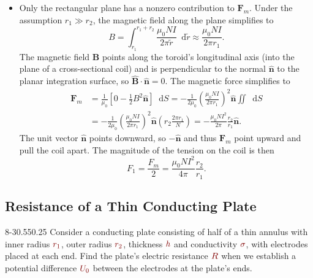 \documentclass[11pt, a4paper]{article}
\newcommand{\diff}{\mathop{}\!\mathrm{d}} %
\newcommand{\dmath}[1]{\textcolor{Maroon}{#1}}  %
\renewcommand{\vec}[1]{\bm{#1}} %
\newcommand{\uvec}[1]{\hat{\vec{#1}}} %
\newcommand{\defaultQuestionWidth}{0.55}
\begin{document}
\begin{itemize}
	\item Only the rectangular plane has a nonzero contribution to $ \vec{F}_{m} $. Under the assumption $ r_{1} \gg r_{2} $, the magnetic field along the plane simplifies to
	\begin{equation*}
		B = \int_{r_{1}}^{r_{1} + r_{2}} \frac{\mu_{0}NI}{2\pi \tilde{r}} \diff \tilde{r} \approx \frac{\mu_{0}NI}{2\pi r_{1}}.
	\end{equation*}
	The magnetic field $ \vec{B} $ points along the toroid's longitudinal axis (into the plane of a cross-sectional coil) and is perpendicular to the normal $ \uvec{n} $ to the planar integration surface, so $ \uvec{B} \cdot \uvec{n} = 0 $. The magnetic force simplifies to
	\begin{align*}
		\vec{F}_{m} &= \frac{1}{\mu_{0}}\left [0 - \frac{1}{2}B^{2}\uvec{n}\right ] \diff S = - \frac{1}{2\mu_{0}} \left(\frac{\mu_{0}NI}{2\pi r_{1}}\right)^{2} \uvec{n} \iint \diff S \\
		&= - \frac{1}{2\mu_{0}} \left(\frac{\mu_{0}NI}{2\pi r_{1}}\right)^{2} \uvec{n} \left (r_{2} \frac{2\pi r_{1}}{N}\right ) = - \frac{\mu_{0}NI^{2}}{2\pi}\frac{r_{2}}{r_{1}} \uvec{n}.
	\end{align*}
	The unit vector $ \uvec{n} $ points downward, so $ -\uvec{n} $ and thus $ \vec{F}_{m} $ point upward and pull the coil apart. The magnitude of the tension on the coil is then
	\begin{equation*}
		F_{1} = \frac{F_{m}}{2} =  \frac{\mu_{0}NI^{2}}{4\pi}\frac{r_{2}}{r_{1}}.
	\end{equation*}
	
\end{itemize}

\subsection{Resistance of a Thin Conducting Plate}
\begin{figurequestion}{8-3}{\defaultQuestionWidth}{0.25}
Consider a conducting plate consisting of half of a thin annulus with inner radius $ \dmath{r_{1}} $, outer radius $ \dmath{r_{2}} $, thickness $ \dmath{h} $ and conductivity $ \dmath{\sigma} $, with electrodes placed at each end.  Find the plate's electric resistance $ \dmath{R} $ when we establish a potential difference $ \dmath{U_{0}}$ between the electrodes at the plate's ends.
\end{figurequestion}
\end{document}
